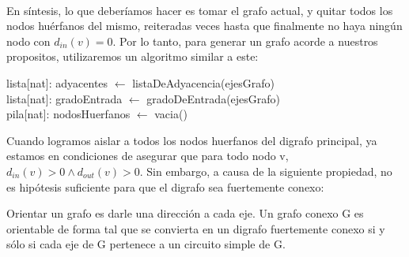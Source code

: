 \\
\par
En síntesis, lo que deberíamos hacer es tomar el grafo actual, y quitar todos los nodos huérfanos del mismo, reiteradas veces hasta que finalmente no haya ningún nodo con $d_{in} (v) = 0$. Por lo tanto, para generar un grafo acorde a nuestros propositos, utilizaremos un algoritmo similar a este:\\
\begin{algorithm}[H]
		\NoCaptionOfAlgo
		\caption{}
		
		lista[nat]: adyacentes $\leftarrow$ listaDeAdyacencia(ejesGrafo)\\
		lista[nat]: gradoEntrada $\leftarrow$ gradoDeEntrada(ejesGrafo)\\
		pila[nat]: nodosHuerfanos $\leftarrow$ vacia()\\

	\end{algorithm}


Cuando logramos aislar a todos los nodos huerfanos del digrafo principal, ya estamos en condiciones de asegurar que para todo nodo v, $d_{in} (v) > 0 \land d_{out} (v) > 0$. Sin embargo, a causa de la siguiente propiedad, no es hipótesis suficiente para que el digrafo sea fuertemente conexo:
\\
\par
\begin{center}
Orientar un grafo es darle una dirección a cada eje. Un grafo conexo G es orientable de forma tal que se convierta en un digrafo fuertemente conexo si y sólo si cada eje de G pertenece a un circuito simple de G.
\end{center}

